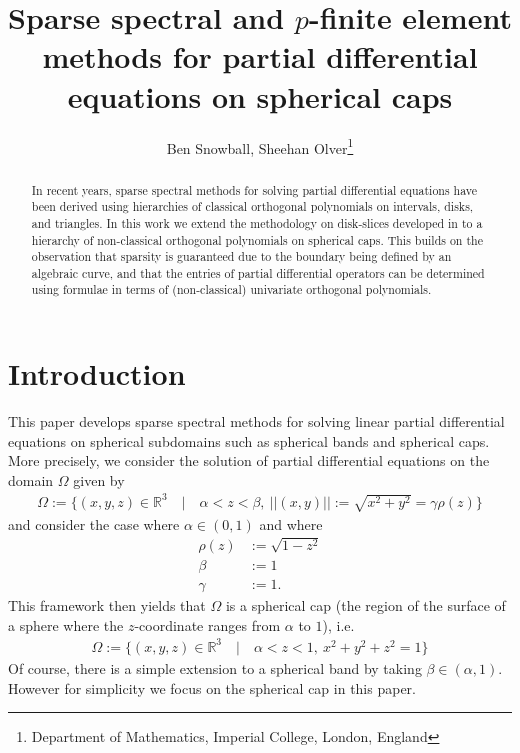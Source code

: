 \documentclass[11pt, oneside]{article}   	%
\title{Sparse spectral and $p$-finite element methods for partial differential equations on spherical caps}
\author{Ben Snowball, Sheehan Olver\thanks{Department of Mathematics, Imperial College, London, England}}
\newcommand{\R}{\mathbb{R}}
\begin{document}
\maketitle

\begin{abstract}
In recent years, sparse spectral methods for solving partial differential equations have been derived using hierarchies of classical orthogonal polynomials on intervals, disks, and triangles. In this work we extend the methodology on disk-slices developed in \cite{snowball2019sparse} to a hierarchy of non-classical orthogonal polynomials on spherical caps. This builds on the observation that sparsity is guaranteed due to the boundary being defined by an algebraic curve, and that the entries of partial differential operators can be determined using formulae in terms of (non-classical) univariate orthogonal polynomials. 
\end{abstract}


%
\section{Introduction}

This paper develops sparse spectral methods for solving linear partial differential equations on spherical subdomains such as spherical bands and spherical caps. More precisely, we consider the solution of partial differential equations on the domain $\Omega$ given by
\begin{align*}
	\Omega := \{(x,y,z) \in \R^3 \quad | \quad \alpha < z < \beta, \: ||(x,y)|| := \sqrt{x^2 + y^2} = \gamma \rho(z)\}
\end{align*}
and consider the case where $\alpha \in (0,1)$ and where
\begin{align*}
	 \rho(z) &:= \sqrt{1-z^2} \\
	 \beta &:= 1 \\
	 \gamma &:= 1.
\end{align*}
This framework then yields that $\Omega$ is a spherical cap (the region of the surface of a sphere where the $z$-coordinate ranges from $\alpha$ to $1$), i.e.
\begin{align*}
	\Omega := \{(x,y,z) \in \R^3 \quad | \quad \alpha < z < 1, \: x^2 + y^2 + z^2 = 1\}
\end{align*}
Of course, there is a simple extension to a spherical band by taking $\beta \in (\alpha,1)$. However for simplicity we focus on the spherical cap in this paper.
\end{document}
